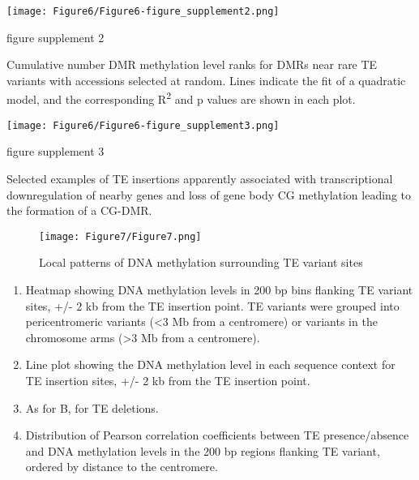 \documentclass[12pt]{article}
\begin{document}
\pagebreak


\setcounter{suppfigure}{5}

\begin{suppfigure}
  \centering
  \texttt{[image: Figure6/Figure6-figure\_supplement2.png]}
  \caption{figure supplement 2}
  \label{fig6s2}
\end{suppfigure}

Cumulative number DMR methylation level ranks for DMRs near rare TE
variants with accessions selected at random. Lines indicate the fit of a
quadratic model, and the corresponding R\textsuperscript{2} and p values are shown in each
plot.

\pagebreak


\setcounter{suppfigure}{5}

\begin{suppfigure}
  \centering
  \texttt{[image: Figure6/Figure6-figure\_supplement3.png]}
  \caption{figure supplement 3}
  \label{fig6s3}
\end{suppfigure}

Selected examples of TE insertions apparently associated with
transcriptional downregulation of nearby genes and loss of gene body CG
methylation leading to the formation of a CG-DMR.

\pagebreak


\begin{figure}
  \centering
  \texttt{[image: Figure7/Figure7.png]}
  \caption{Local patterns of DNA methylation surrounding TE variant sites}
  \label{fig7}
\end{figure}

\begin{enumerate}
\def\labelenumi{(\Alph{enumi})}
\item
  Heatmap showing DNA methylation levels in 200 bp bins flanking TE
  variant sites, +/- 2 kb from the TE insertion point. TE variants were
  grouped into pericentromeric variants (\textless{}3 Mb from a
  centromere) or variants in the chromosome arms (\textgreater{}3 Mb
  from a centromere).
\item
  Line plot showing the DNA methylation level in each sequence context
  for TE insertion sites, +/- 2 kb from the TE insertion point.
\item
  As for B, for TE deletions.
\item
  Distribution of Pearson correlation coefficients between TE
  presence/absence and DNA methylation levels in the 200 bp regions
  flanking TE variant, ordered by distance to the centromere.
\end{enumerate}
\end{document}
